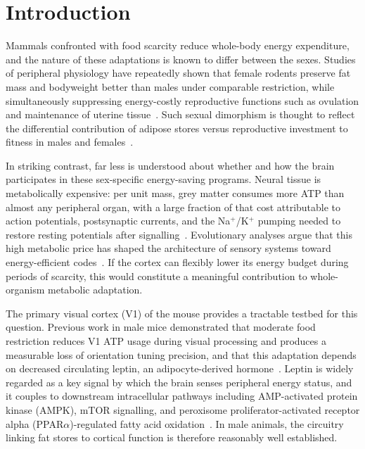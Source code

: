 \section{Introduction}

Mammals confronted with food scarcity reduce whole-body energy expenditure, and the nature of these adaptations is known to differ between the sexes. Studies of peripheral physiology have repeatedly shown that female rodents preserve fat mass and bodyweight better than males under comparable restriction, while simultaneously suppressing energy-costly reproductive functions such as ovulation and maintenance of uterine tissue~\cite{lovdel2024hsd11b1,lopezdominguez2016omega3,greenfield2025lifespan,ryu2023timerestricted,jeromson2024gdf15}. Such sexual dimorphism is thought to reflect the differential contribution of adipose stores versus reproductive investment to fitness in males and females~\cite{nestor2014crosstalk}.

In striking contrast, far less is understood about whether and how the brain participates in these sex-specific energy-saving programs. Neural tissue is metabolically expensive: per unit mass, grey matter consumes more ATP than almost any peripheral organ, with a large fraction of that cost attributable to action potentials, postsynaptic currents, and the Na$^+$/K$^+$ pumping needed to restore resting potentials after signalling~\cite{attwell2001energy,niven2008energy}. Evolutionary analyses argue that this high metabolic price has shaped the architecture of sensory systems toward energy-efficient codes~\cite{niven2008energy}. If the cortex can flexibly lower its energy budget during periods of scarcity, this would constitute a meaningful contribution to whole-organism metabolic adaptation.

The primary visual cortex (V1) of the mouse provides a tractable testbed for this question. Previous work in male mice demonstrated that moderate food restriction reduces V1 ATP usage during visual processing and produces a measurable loss of orientation tuning precision, and that this adaptation depends on decreased circulating leptin, an adipocyte-derived hormone~\cite{zhang1994positional}. Leptin is widely regarded as a key signal by which the brain senses peripheral energy status, and it couples to downstream intracellular pathways including AMP-activated protein kinase (AMPK), mTOR signalling, and peroxisome proliferator-activated receptor alpha (PPAR$\alpha$)-regulated fatty acid oxidation~\cite{steinberg2023ampk,laplante2013mtorc1,yao2022ampk,su2019hsf1,ward2016ampk}. In male animals, the circuitry linking fat stores to cortical function is therefore reasonably well established.

